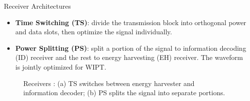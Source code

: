 \documentclass[xcolor={table}]{beamer}
\begin{document}
\begin{frame}[fragile=singleslide,t]
\begin{columns}[onlytextwidth,T]
\begin{column}{.47\textwidth}
\begin{block}{Receiver Architectures}
\begin{itemize}
  \item \textbf{Time Switching (TS)}: divide the transmission block into orthogonal power and data slots, then optimize the signal individually.
  \item \textbf{Power Splitting (PS)}: split a portion of the signal to information decoding (ID) receiver and the rest to energy harvesting (EH) receiver. The waveform is jointly optimized for WIPT.
\end{itemize}
\begin{figure}
  \centering
  \caption{Receivers \citep{Clerckx2019}: (a) TS switches between energy harvester and information decoder; (b) PS splits the signal into separate portions.}\label{fig:receivers}
\end{figure}
\end{block}


\end{column}
\end{columns}
\end{frame}
\end{document}

